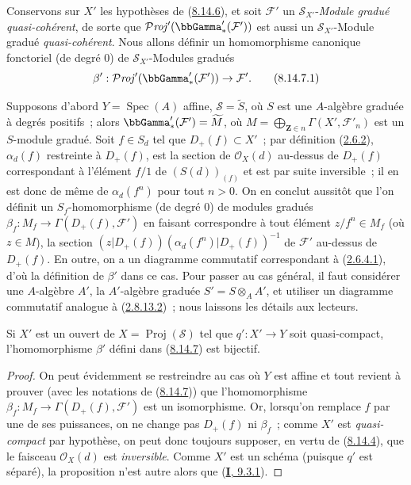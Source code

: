 \begin{env}[8.14.7]
\label{II.8.14.7-fr}
Conservons sur $X'$ les hypothèses de
(\hyperref[II.8.14.6-fr]{8.14.6}), et soit $\mathcal{F}'$ un
$\mathcal{S}_{X'}$-\emph{Module gradué quasi-cohérent}, de sorte que
$\mathcal{P}\mathit{roj}'(\bbGamma'_*(\mathcal{F}'))$ est aussi un
$\mathcal{S}_{X'}$-Module gradué \emph{quasi-cohérent}. Nous allons définir un
homomorphisme canonique fonctoriel (de degré $0$) de
$\mathcal{S}_{X'}$-Modules gradués
\begin{equation}
\label{II.8.14.7.1-fr}
  \beta':\mathcal{P}\mathit{roj}'(\bbGamma'_*(\mathcal{F}'))\to\mathcal{F}'.
\tag{8.14.7.1}
\end{equation}

Supposons d'abord $Y=\operatorname{Spec}(A)$ affine,
$\mathcal{S}=\widetilde{S}$, où $S$ est une $A$-algèbre graduée à degrés
positifs~; alors $\bbGamma'_*(\mathcal{F}')=\widetilde{M}$, où
$M=\bigoplus_{\mathbf{Z}\in n}\Gamma(X',\mathcal{F}'_n)$ est un $S$-module
gradué. Soit $f\in S_d$ tel que $D_+(f)\subset X'$~; par définition
(\hyperref[II.2.6.2-fr]{2.6.2}), $\alpha_d(f)$ restreinte à $D_+(f)$, est la
section de $\mathcal{O}_X(d)$ au-dessus de $D_+(f)$ correspondant à
l'élément $f/1$ de $(S(d))_{(f)}$ et est par suite inversible~; il en est donc
de même de $\alpha_d(f^n)$ pour tout $n>0$. On en conclut aussitôt que
l'on définit un $S_f$-homomorphisme (de degré $0$) de modules gradués
$\beta_f:M_f\to\Gamma(D_+(f),\mathcal{F}')$ en faisant correspondre à tout
élément $z/f^n\in M_f$ (où $z\in M$), la section
$(z|D_+(f))(\alpha_d(f^n)|D_+(f))^{-1}$ de $\mathcal{F}'$ au-dessus de
$D_+(f)$. En outre, on a un diagramme commutatif correspondant à
(\hyperref[II.2.6.4.1-fr]{2.6.4.1}), d'où la définition de $\beta'$ dans ce
cas. Pour passer au cas général, il faut considérer une $A$-algèbre $A'$,
la $A'$-algèbre graduée $S'=S\otimes_A A'$, et utiliser un diagramme
commutatif analogue à (\hyperref[II.2.8.13.2-fr]{2.8.13.2})~; nous laissons
les détails aux lecteurs.
\end{env}

\begin{proposition}[8.14.8]
\label{II.8.14.8-fr}
Si $X'$ est un ouvert de $X=\operatorname{Proj}(\mathcal{S})$ tel que
$q':X'\to Y$ soit quasi-compact, l'homomorphisme $\beta'$ défini dans
\textup{(\hyperref[II.8.14.7-fr]{8.14.7})} est bijectif.
\end{proposition}

\begin{proof}
On peut évidemment se restreindre au cas où $Y$ est affine et tout revient à
prouver (avec les notations de (\hyperref[II.8.14.7-fr]{8.14.7})) que
l'homomorphisme $\beta_f:M_f\to\Gamma(D_+(f),\mathcal{F}')$ est un
isomorphisme. Or, lorsqu'on remplace $f$ par une de ses puissances, on ne
change pas $D_+(f)$ ni $\beta_f$~; comme $X'$ est \emph{quasi-compact} par
hypothèse, on peut donc toujours supposer, en vertu de
(\hyperref[II.8.14.4-fr]{8.14.4}), que le faisceau $\mathcal{O}_X(d)$ est
\emph{inversible}. Comme $X'$ est un schéma (puisque $q'$ est séparé), la
proposition n'est autre alors que (\hyperref[I.9.3.1-fr]{\textbf{I}, 9.3.1}).
\end{proof}

